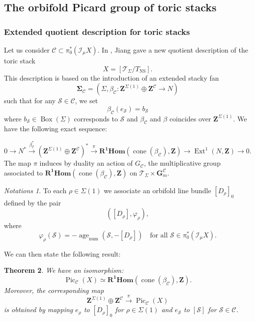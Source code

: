 \documentclass{proc-l}
\newcommand{\Z}{\mathbf{Z}}
\newcommand{\G}{\mathbf{G}}
\DeclareMathOperator{\Pic}{Pic}
\DeclareMathOperator{\Ext}{Ext}
\DeclareMathOperator{\coneform}{cone}
\DeclareMathOperator{\num}{num}
\DeclareMathOperator{\age}{age}
\DeclareMathOperator{\NS}{NS}
\DeclareMathOperator{\Boxe}{Box}
\newcommand{\stackS}{\mathcal{S}}
\newcommand{\stackT}{\mathcal{T}}
\newcommand{\sheafI}{\mathcal{I}}
\newcommand{\twistsector}{\pi_0^*(\sheafI_{\mu} X)}
\newtheorem{theorem}{Theorem}[section]
\theoremstyle{definition}
\theoremstyle{remark}
\newtheorem{Notations}[theorem]{Notations}
\numberwithin{equation}{section}
\begin{document}
\subsection{The orbifold Picard group of toric stacks}


\subsubsection{Extended quotient description for toric stacks}

Let us consider $\mathcal{C} \subset \twistsector$. In \cite{Jiang2005TheOC}, Jiang gave a new quotient description of the toric stack $$X = [\stackT_{\Sigma} / T_{\NS} ].$$ This description is based on the introduction of an extended stacky fan $$\mathbf{\Sigma}_{\mathcal{C}} = \left(\Sigma, \beta_{\mathcal{C}} : \Z^{\Sigma(1)} \oplus \Z^{\mathcal{C} } \rightarrow N \right)$$such that for any $\stackS \in \mathcal{C}$, we set $$\beta_{\mathcal{C}}(e_{\stackS}) = b_{\stackS}$$ where $b_{\stackS} \in \Boxe(\Sigma)$ corresponds to $\stackS$ and $\beta_{\mathcal{C}}$ and $\beta$ coincides over $\Z^{\Sigma(1)}$. We have the following exact sequence:

$$ 0 \rightarrow N^* \xrightarrow{\beta_{\mathcal{C}}^*} (\Z^{\Sigma(1)} \oplus \Z^{\mathcal{C} })^* \xrightarrow{\pi} \mathbf{R^1 Hom}(\coneform(\beta_{\mathcal{C}}),\Z) \rightarrow \Ext^1(N,\Z) \rightarrow 0 .$$The map $\pi$ induces by duality an action of $G_{\mathcal{C}}$, the multiplicative group associated to $\mathbf{R^1 Hom}(\coneform(\beta_{\mathcal{C}}),\Z)$  on $\stackT_{\Sigma} \times \G_m^{\mathcal{C}}$.

\begin{Notations}\label{notation_orbifold_T_invariant_divisor}
To each $\rho \in \Sigma(1)$ we associate an orbifold line bundle $[D_{\rho}]_0$
defined by the pair
$$([D_\rho],\varphi_{\rho}),$$
where
$$\varphi_{\rho}(\stackS) = - \age_{\num}(\stackS,-[D_{\rho}]) \quad \text{for all } \stackS \in \twistsector.$$   
\end{Notations}
We can then state the following result:

\begin{theorem}\label{theorem_action_orbi_neron_severi_torus}
    We have an isomorphism:
    $$ \Pic_{\mathcal{C}}(X) \simeq \mathbf{R^1 Hom}(\coneform(\beta_{\mathcal{C}}),\Z).$$Moreover, the corresponding map $$ \Z^{\Sigma(1)} \oplus \Z^{\mathcal{C} } \xrightarrow{\pi} \Pic_{\mathcal{C}}(X)$$is obtained by mapping $e_{\rho}$ to $[D_{\rho}]_{0}$ for $\rho \in \Sigma(1)$ and $e_{\stackS}$ to $[\stackS]$ for $\stackS \in \mathcal{C}$.
\end{theorem}
\end{document}
